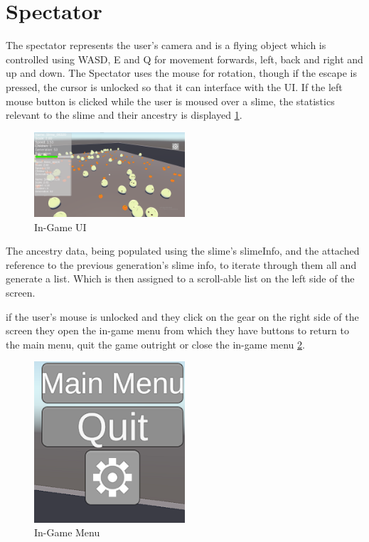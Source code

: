 \section{Spectator}
The spectator represents the user's camera and is a flying object which is controlled using WASD, E and Q for movement forwards, left, back and right and up and down. The Spectator uses the mouse for rotation, though if the escape is pressed, the cursor is unlocked so that it can interface with the UI. If the left mouse button is clicked while the user is moused over a slime, the statistics relevant to the slime and their ancestry is displayed \ref{image:inGameUI}.
\begin{figure}[ht!]
    \includegraphics[width=0.5\textwidth]{images/GameUI.png}
    \caption{In-Game UI}
    \label{image:inGameUI}
\end{figure}
\par
The ancestry data, being populated using the slime's slimeInfo, and the attached reference to the previous generation's slime info, to iterate through them all and generate a list. Which is then assigned to a scroll-able list on the left side of the screen.
\par
if the user's mouse is unlocked and they click on the gear on the right side of the screen they open the in-game menu from which they have buttons to return to the main menu, quit the game outright or close the in-game menu \ref{image:inGameMenu}.
\begin{figure}[ht!]
    \includegraphics[width=0.5\textwidth]{images/Game Menu.png}
    \caption{In-Game Menu}
    \label{image:inGameMenu}
\end{figure}